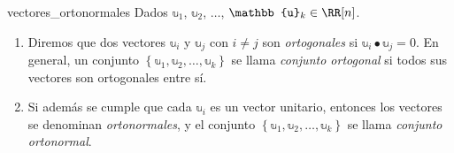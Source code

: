 \newpage

\begin{definicion}{}{vectores_ortonormales}
    Dados $\mathbb{u}_1$, $\mathbb{u}_2$, $\dots$, $\mathbb{u}_k \in \RR[n]$.
    \begin{enumerate}[label=\roman*), topsep=6pt, itemsep=0pt]
        \item Diremos que dos vectores $\mathbb{u}_i$ y $\mathbb{u}_j$ con $i \neq j$ son \emph{ortogonales} si $\mathbb{u}_i \bullet \mathbb{u}_j = 0$. En general, un conjunto $\left\{ \mathbb{u}_1, \mathbb{u}_2, \dots, \mathbb{u}_k \right\}$ se llama \emph{conjunto ortogonal} si todos sus vectores son ortogonales entre sí.
        \item Si además se cumple que cada $\mathbb{u}_i$ es un vector unitario, entonces los vectores se denominan \emph{ortonormales}, y el conjunto $\left\{ \mathbb{u}_1, \mathbb{u}_2, \dots, \mathbb{u}_k \right\}$ se llama \emph{conjunto ortonormal}.
    \end{enumerate}
\end{definicion}

